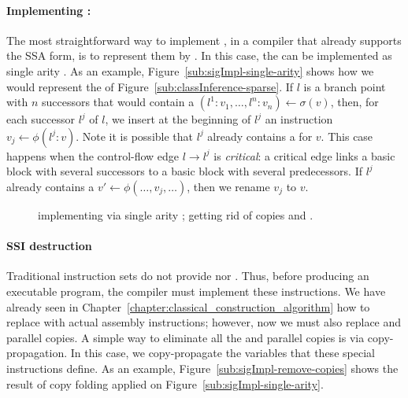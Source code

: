 {\paragraph{Implementing \sigmafuns: }
The most straightforward way to implement \sigmafuns,\index{\sigmafun} in a compiler that already supports the SSA form, is to represent them by \phifuns.
In this case, the \sigmafuns can be implemented as single arity \phifuns.
As an example, Figure~\ref{sub:sigImpl-single-arity} shows how we would represent the \sigmafuns of Figure~\ref{sub:classInference-sparse}.
If $l$ is a branch point with $n$ successors that would contain a \sigmafun $(l^1:v_1, \ldots, l^n:v_n) \gets \sigma(v)$, then, for each successor $l^j$ of $l$, we insert at the beginning of $l^j$ an instruction $v_j \gets \phi(l^j:v)$.
Note it is possible that $l^j$ already contains a \phifun for $v$.
This case happens when the control-flow edge $l \rightarrow l^j$ is {\em critical}:
a critical edge links a basic block with several successors to a basic block with several predecessors.
If $l^j$ already contains a \phifun $v' \gets \phi(\ldots, v_j, \ldots)$, then we rename $v_j$ to $v$.

\begin{figure}[t!]
\hspace{-1.3cm}
  \hfill
  \caption{\protect{} implementing \sigmafuns via single arity \phifuns; \protect{} getting rid of copies and \sigmafuns.}
\label{fig:sigImpl}
\end{figure}

\paragraph{SSI destruction}
Traditional instruction sets do not provide \phifuns nor \sigmafuns.
Thus, before producing an executable program, the compiler must implement these instructions.
We have already seen in Chapter~\ref{chapter:classical_construction_algorithm} how to replace \phifuns with actual assembly instructions; however, now we must also replace \sigmafuns and parallel copies.
A simple way to eliminate all the \sigmafuns and parallel copies is via copy-propagation.
In this case, we copy-propagate the variables that these special instructions define.
As an example, Figure~\ref{sub:sigImpl-remove-copies} shows the result of copy folding applied on Figure~\ref{sub:sigImpl-single-arity}.

}
